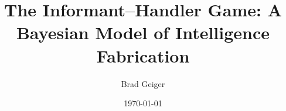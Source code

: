 \documentclass[12pt]{article}
\begin{document}
\title{The Informant--Handler Game: A Bayesian Model of Intelligence Fabrication}
\author{Brad Geiger}
\date{\today}

\maketitle












\end{document}
